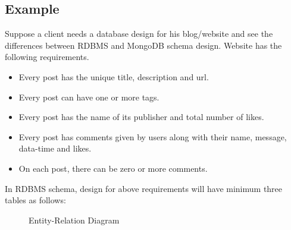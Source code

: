 \documentclass[12pt]{article}
\newcommand{\pkfield}[1]{\emoji{key}\ \texttt{#1}}
\newcommand{\field}[1]{\phantom{\emoji{key}\ }\texttt{#1}}
\newcommand{\entity}[1]{\bfseries \texttt{#1}}
\begin{document}
\subsection{Example}

Suppose a client needs a database design for his blog/website and see
the differences between RDBMS and MongoDB schema design. Website has the
following requirements.

\begin{itemize}
  \item Every post has the unique title, description and url.
  \item Every post can have one or more tags.
  \item Every post has the name of its publisher and total number of likes.
  \item Every post has comments given by users along with their name,
    message, data-time and likes.
  \item On each post, there can be zero or more comments.
\end{itemize}

In RDBMS schema, design for above requirements will have minimum three
tables as follows:
\begin{figure}[H]
  \caption{Entity-Relation Diagram}
  \label{fig:er-diagram}
\end{figure}
\end{document}

